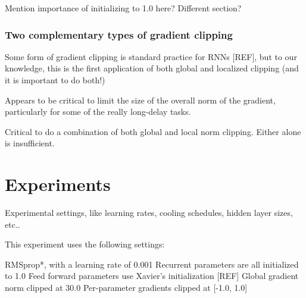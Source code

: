 \documentclass{article}
\begin{document}
Mention importance of initializing to 1.0 here? Different section?
\subsubsection{Two complementary types of gradient clipping}

Some form of gradient clipping is standard practice for RNNs [REF], but to our knowledge, this is the first application of both global and localized clipping (and it is important to do both!)

Appears to be critical to limit the size of the overall norm of the gradient, particularly for some of the really long-delay tasks.

Critical to do a combination of both global and local norm clipping. Either alone is insufficient.

\section{Experiments}
\label{others}
Experimental settings, like learning rates, cooling schedules, hidden layer sizes, etc..


This experiment uses the following settings:

RMSprop*, with a learning rate of 0.001
Recurrent parameters are all initialized to 1.0
Feed forward parameters use Xavier’s initialization [REF]
Global gradient norm clipped at 30.0
Per-parameter gradients clipped at [-1.0, 1.0]
\end{document}
